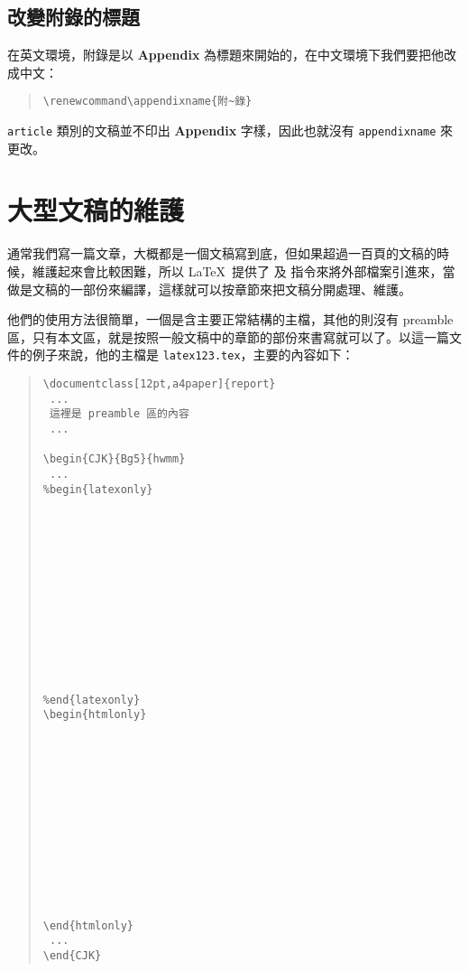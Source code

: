 \subsection{改變附錄的標題}

在英文環境，附錄是以 \textbf{Appendix} 為標題來開始的，在中文環境下我們要把他改成中文：

\begin{quote}
  \begin{verbatim}
\renewcommand\appendixname{附~錄}
\end{verbatim}
\end{quote}

\texttt{article} 類別的文稿並不印出 \textbf{Appendix} 字樣，因此也就沒有 \texttt{appendixname} 來更改。

\section{大型文稿的維護}
\label{sec:largefile}

通常我們寫一篇文章，大概都是一個文稿寫到底，但如果超過一百頁的文稿的時候，維護起來會比較困難，所以 \LaTeX\ 提供了 \verb|| 及 \verb|| 指令來將外部檔案引進來，當做是文稿的一部份來編譯，這樣就可以按章節來把文稿分開處理、維護。

他們的使用方法很簡單，一個是含主要正常結構的主檔，其他的則沒有 preamble 區，只有本文區，就是按照一般文稿中的章節的部份來書寫就可以了。以這一篇文件的例子來說，他的主檔是 \texttt{latex123.tex}，主要的內容如下：

\begin{quote}
  \begin{verbatim}
\documentclass[12pt,a4paper]{report}
 ...
 這裡是 preamble 區的內容
 ...

\begin{CJK}{Bg5}{hwmm}
 ...
%begin{latexonly} 













%end{latexonly}
\begin{htmlonly}













\end{htmlonly}
 ...
\end{CJK}

\end{verbatim}
\end{quote}

